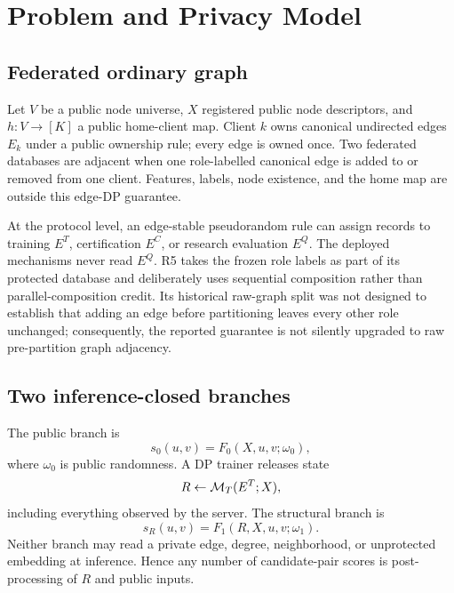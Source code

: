 \section{Problem and Privacy Model}
\label{sec:problem}

\subsection{Federated ordinary graph}

Let $V$ be a public node universe, $X$ registered public node descriptors, and
$h:V\rightarrow[K]$ a public home-client map. Client $k$ owns canonical
undirected edges $E_k$ under a public ownership rule; every edge is owned once.
Two federated databases are adjacent when one role-labelled canonical edge is
added to or removed from one client. Features, labels, node existence, and the
home map are outside this edge-DP guarantee.

At the protocol level, an edge-stable pseudorandom rule can assign records to
training $E^T$, certification $E^C$, or research evaluation $E^Q$. The
deployed mechanisms never read $E^Q$. R5 takes the frozen role labels as part
of its protected database and deliberately uses sequential composition rather
than parallel-composition credit. Its historical raw-graph split was not
designed to establish that adding an edge before partitioning leaves every
other role unchanged; consequently, the reported guarantee is not silently
upgraded to raw pre-partition graph adjacency.

\subsection{Two inference-closed branches}

The public branch is
\begin{equation}
  s_0(u,v)=F_0(X,u,v;\omega_0),
\end{equation}
where $\omega_0$ is public randomness. A DP trainer releases state
\begin{equation}
  R\leftarrow \mathcal{M}_T(E^T;X),
\end{equation}
including everything observed by the server. The structural branch is
\begin{equation}
  s_R(u,v)=F_1(R,X,u,v;\omega_1).
\end{equation}
Neither branch may read a private edge, degree, neighborhood, or unprotected
embedding at inference. Hence any number of candidate-pair scores is
post-processing of $R$ and public inputs.

